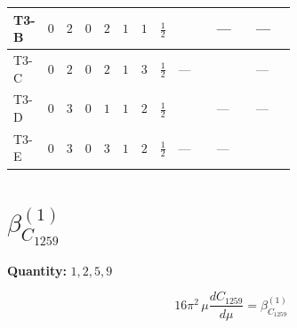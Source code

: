 \documentclass[8pt]{article}
\begin{document}
\begin{landscape}
\begin{longtable}{@{}llcccccc >{\raggedright\arraybackslash}p{0.21\linewidth} >{\raggedright\arraybackslash}p{0.21\linewidth} >{\raggedright\arraybackslash}p{0.21\linewidth}@{}}
\midrule
T3-B & $0$ & $2$ & $0$ & $2$ & $1$ & $1$ & $\frac{1}{2}$ & \scriptsize\adjustbox{max width=\linewidth}{$\begin{gathered} \frac{\sqrt{3} lambdaT_{3} \overline{y_{1}} \overline{y_{2}}}{3 MF}\end{gathered}$} & --- & --- \\
\midrule
T3-C & $0$ & $2$ & $0$ & $2$ & $1$ & $3$ & $\frac{1}{2}$ & --- & \scriptsize\adjustbox{max width=\linewidth}{$\begin{gathered} - \frac{lambdaT_{3} \overline{y_{1}} \overline{y_{2}}}{3 MF}\end{gathered}$} & --- \\
\midrule
T3-D & $0$ & $3$ & $0$ & $1$ & $1$ & $2$ & $\frac{1}{2}$ & \scriptsize\adjustbox{max width=\linewidth}{$\begin{gathered} \frac{\sqrt{3} lambdaT_{3} \overline{y_{1}} \overline{y_{2}}}{3 MF}\end{gathered}$} & --- & --- \\
\midrule
T3-E & $0$ & $3$ & $0$ & $3$ & $1$ & $2$ & $\frac{1}{2}$ & --- & --- & \scriptsize\adjustbox{max width=\linewidth}{$\begin{gathered} - \frac{\sqrt{6} lambdaT_{3} \overline{y_{1}} \overline{y_{2}}}{3 MF}\end{gathered}$} \\
\midrule
\bottomrule
\end{longtable}
\clearpage
\section*{$\beta_{C_{1259}}^{(1)}$}
\noindent\textbf{Quantity: }$\mathrm{1,2,5,9}$\par\smallskip
\[16\pi^2\,\mu\frac{d C_{1259}}{d\mu}=\beta_{C_{1259}}^{(1)}\]

\end{landscape}
\end{document}
